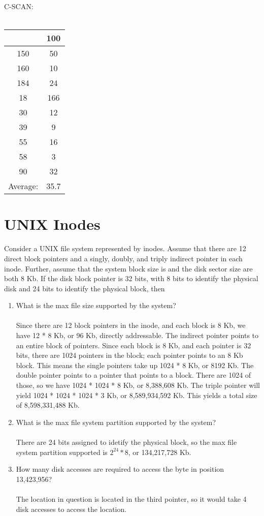 \documentclass{article}
\begin{document}
\begin{minipage}[t]{0.25\textwidth}
C-SCAN:\\\\
\begin{tabular}{c|c}
& 100\\
\hline
150 & 50\\
160 & 10\\
184 & 24\\
18 & 166\\
30 & 12\\
39 & 9\\
55 & 16\\
58 & 3\\
90 & 32\\
\hline
Average: & 35.7
\end{tabular}
\end{minipage}
\newpage



\section{UNIX Inodes}
Consider a UNIX file system represented by inodes.
Assume that there are 12 direct block pointers and a singly, doubly, and triply
indirect pointer in each inode.
Further, assume that the system block size is and the disk sector size are both
8 Kb.
If the disk block pointer is 32 bits, with 8 bits to identify the physical disk
and 24 bits to identify the physical block, then
\begin{enumerate}
\item What is the max file size supported by the system?\\\\
Since there are 12 block pointers in the inode, and each block is 8 Kb, we have
12 * 8 Kb, or 96 Kb, directly addressable.
The indirect pointer points to an entire block of pointers.
Since each block is 8 Kb, and each pointer is 32 bits, there are 1024 pointers
in the block; each pointer points to an 8 Kb block.
This means the single pointers take up 1024 * 8 Kb, or 8192 Kb.
The double pointer points to a pointer that points to a block.
There are 1024 of those, so we have 1024 * 1024 * 8 Kb, or 8,388,608 Kb.
The triple pointer will yield 1024 * 1024 * 1024 * 3 Kb, or 8,589,934,592 Kb.
This yields a total size of 8,598,331,488 Kb.
\item What is the max file system partition supported by the system?\\\\
There are 24 bits assigned to idetify the physical block, so the max file system
partition supported is $2^{24} * 8$, or 134,217,728 Kb.
\item How many disk accesses are required to access the byte in position 13,423,956?\\\\
The location in question is located in the third pointer, so it would take 4 disk
accesses to access the location.
\end{enumerate}
\end{document}
